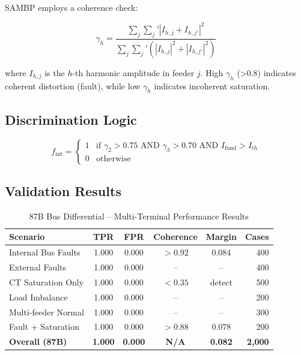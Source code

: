 \documentclass[12pt,a4paper]{article}
\begin{document}
SAMBP employs a coherence check:

\begin{equation}
\gamma_h = \frac{\sum_j \sum_j' |I_{h,j} + I_{h,j'}|^2}{\sum_j \sum_j' (|I_{h,j}|^2 + |I_{h,j'}|^2)}
\label{eq:coherence}
\end{equation}

where $I_{h,j}$ is the $h$-th harmonic amplitude in feeder $j$. High $\gamma_h$ (>0.8) 
indicates coherent distortion (fault), while low $\gamma_h$ indicates incoherent saturation.

\subsection{Discrimination Logic}
\label{subsec:87b_logic}

\begin{equation}
f_{\text{int}} = \begin{cases}
1 & \text{if } \gamma_2 > 0.75 \text{ AND } \gamma_3 > 0.70 \text{ AND } I_{\text{fund}} > I_{th} \\
0 & \text{otherwise}
\end{cases}
\label{eq:87b_fint}
\end{equation}

\subsection{Validation Results}
\label{subsec:87b_results}

\begin{table}[H]
\centering
\caption{87B Bus Differential -- Multi-Terminal Performance Results}
\label{tab:87b_validation}
\begin{tabular}{lccccr}
\toprule
\textbf{Scenario} & \textbf{TPR} & \textbf{FPR} & \textbf{Coherence} & \textbf{Margin} & \textbf{Cases} \\
\midrule
Internal Bus Faults & 1.000 & 0.000 & $>0.92$ & 0.084 & 400 \\
External Faults & 1.000 & 0.000 & -- & -- & 400 \\
CT Saturation Only & 1.000 & 0.000 & $<0.35$ & detect & 500 \\
Load Imbalance & 1.000 & 0.000 & -- & -- & 200 \\
Multi-feeder Normal & 1.000 & 0.000 & -- & -- & 300 \\
Fault + Saturation & 1.000 & 0.000 & $>0.88$ & 0.078 & 200 \\
\midrule
\textbf{Overall (87B)} & \textbf{1.000} & \textbf{0.000} & \textbf{N/A} & \textbf{0.082} & \textbf{2,000} \\
\bottomrule
\end{tabular}
\end{table}
\end{document}
